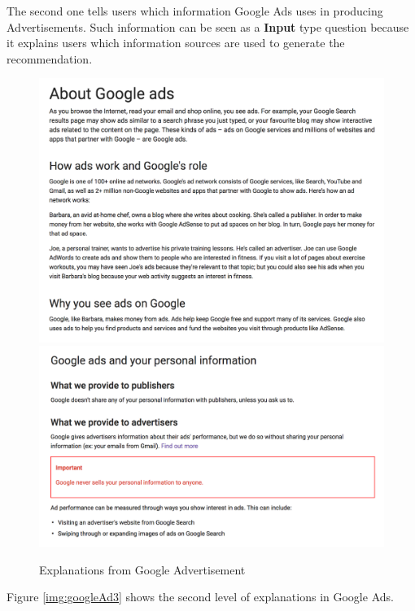        The second one tells users which information Google Ads uses in producing Advertisements. 
       Such information can be seen as a \textbf{Input} type question because it explains 
       users which information sources are used to generate the recommendation.
        \begin{figure}[H]
            \centering
            \captionsetup{justification=centering}
            \begin{mdframed}
                \includegraphics[width=1\textwidth]{img/googleAd2-1}
                \includegraphics[width=1\textwidth]{img/googleAd2-2}
            \end{mdframed}
            \caption{Explanations from Google Advertisement\cite{googleAd2}}
            \label{img:googleAd2}
        \end{figure}
        \indent Figure \ref{img:googleAd3} shows the second level of explanations in Google Ads.
